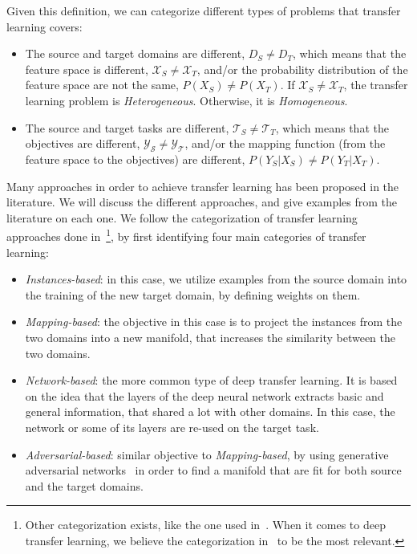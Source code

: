  \par Given this definition, we can categorize different types of problems that transfer learning covers:

  \begin{itemize}
      \item The source and target domains are different, $D_S \neq D_T$, which means that the feature space is different, $\mathcal{X}_S \neq \mathcal{X}_T$, and/or the probability distribution of the feature space are not the same, $P(X_S) \neq P(X_T)$. If $\mathcal{X}_S \neq \mathcal{X}_T$, the transfer learning problem is \textit{Heterogeneous}. Otherwise, it is \textit{Homogeneous}.

      \item The source and target tasks are different, $\mathcal{T}_S \neq \mathcal{T}_T$, which means that the objectives are different, $\mathcal{Y_S} \neq \mathcal{Y_T}$, and/or the mapping function (from the feature space to the objectives) are different, $P(Y_S|X_S) \neq P(Y_T|X_T)$.
  \end{itemize}

  \par Many approaches in order to achieve transfer learning has been proposed in the literature. We will discuss the different approaches, and give examples from the literature on each one. We follow the categorization of transfer learning approaches done in~\citep{dtl2018survey}\footnote{Other categorization exists, like the one used in~\citep{weiss2016survey}. When it comes to deep transfer learning, we believe the categorization in~\citep{dtl2018survey} to be the most relevant.}, by first identifying four main categories of transfer learning:
  \begin{itemize}
    \item \textit{Instances-based}: in this case, we utilize examples from the source domain into the training of the new target domain, by defining weights on them.
    \item \textit{Mapping-based}: the objective in this case is to project the instances from the two domains into a new manifold, that increases the similarity between the two domains.
    \item \textit{Network-based}: the more common type of deep transfer learning. It is based on the idea that the layers of the deep neural network extracts basic and general information, that shared a lot with other domains. In this case, the network or some of its layers are re-used on the target task.
    \item \textit{Adversarial-based}: similar objective to \textit{Mapping-based}, by using generative adversarial networks~\citep{goodfellow2014generative} in order to find a manifold that are fit for both source and the target domains.
  \end{itemize}

